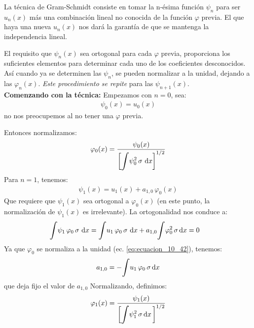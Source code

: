 \documentclass[12pt]{article}
\def\scaleint#1{\vcenter{\hbox{\scaleto[3ex]{\displaystyle\int}{#1}}}}
\numberwithin{equation}{section}
\begin{document}
La técnica de Gram-Schmidt consiste en tomar la n-ésima función $\psi_{n}$ para ser $u_{n}(x)$ más una combinación lineal no conocida de la función $\varphi$ previa. El que haya una nueva $u_{n}(x)$ nos dará la garantía de que se mantenga la independencia lineal.
\par
El requisito que $\psi_{n}(x)$ sea ortogonal para cada $\varphi$ previa, proporciona los suficientes elementos para determinar cada uno de los coeficientes desconocidos. Así cuando ya se determinen las $\psi_{n}$, se pueden normalizar a la unidad, dejando a las  $\varphi_{n} (x)$.  \emph{Este procedimiento se repite} para las $\psi_{n+1}(x)$.
\\[0.5em]
\textbf{Comenzando con la técnica: } Empezamos con $n = 0$, sea:
\begin{align}
\psi_{0} (x) = u_{0} (x)
\label{eq:ecuacion_10_41}
\end{align}
no nos preocupemos al no tener una $\varphi$ previa.
\par
Entonces normalizamos:
\begin{align}
\varphi_{0}(x) = \dfrac{\psi_{0} (x)}{\left[ \displaystyle \scaleint{6ex} \psi_{0}^{2} \, \sigma \, \dd{x} \right]^{1/2}}
\label{eq:ecuacion_10_42}
\end{align}
Para $n = 1$, tenemos:
\begin{align}
\psi_{1} (x) = u_{1} (x) + a_{1, 0} \, \varphi_{0} (x)
\label{eq:ecuacion_10_43}
\end{align}
Que requiere que $\psi_{1} (x)$ sea ortogonal a $\varphi_{0} (x)$ (en este punto, la normalización de $\psi_{1} (x)$ es irrelevante). La ortogonalidad nos conduce a:
\begin{eqnarray}
\begin{aligned}[b]
\scaleint{6ex} \psi_{1} \, \varphi_{0} \, \sigma \, \dd{x} &=  \scaleint{6ex} u_{1} \, \varphi_{0} \, \sigma \, \dd{x} + a_{1,0} \scaleint{6ex} \varphi_{0}^{2} \, \sigma \dd{x} = 0
\end{aligned}
\label{eq:ecuacion_10_44}
\end{eqnarray}
Ya que $\varphi_{0}$ se normaliza a la unidad (ec. \ref{eq:ecuacion_10_42}), tenemos:
\begin{align}
a_{1,0} = - \scaleint{6ex} u_{1} \, \varphi_{0} \, \sigma \dd{x}
\label{eq:ecuacion_10_45}
\end{align}
que deja fijo el valor de $a_{1, 0}$
Normalizando, definimos:
\begin{align}
\varphi_{1} (x) = \dfrac{\psi_{1} (x)}{ \bigg[ \displaystyle \scaleint{6ex} \psi_{1}^{2} \, \sigma \dd{x} \bigg]^{1/2}}
\label{eq:ecuacion_10_46}
\end{align}
\end{document}
